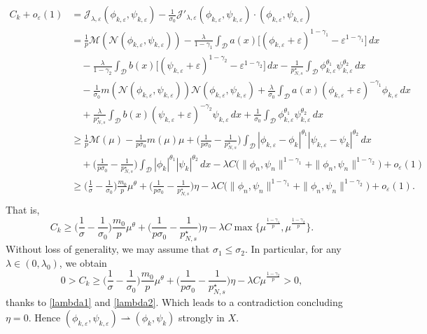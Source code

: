 \documentclass[reqno]{amsart}
\begin{document}
\begin{align*}
C_k+o_\varepsilon(1)&=\mathcal{J}_{\lambda,\varepsilon}(\phi_{k,\varepsilon},\psi_{k,\varepsilon})-\frac{1}{\sigma_0}\mathcal{J}'_{\lambda,\varepsilon}(\phi_{k,\varepsilon},\psi_{k,\varepsilon})\cdot (\phi_{k,\varepsilon},\psi_{k,\varepsilon})\\
&=\frac{1}{p}\mathscr{M}(\mathcal{N}(\phi_{k,\varepsilon},\psi_{k,\varepsilon}))-\frac{\lambda}{1-\gamma_1}\int_\mathcal{D} a(x)\Big[(\phi_{k,\varepsilon}+\varepsilon)^{1-\gamma_1}-\varepsilon^{1-\gamma_1}\Big]\,dx\\
&\quad-\frac{\lambda}{1-\gamma_2}\int_\mathcal{D} b(x)\Big[(\psi_{k,\varepsilon}+\varepsilon)^{1-\gamma_2}-\varepsilon^{1-\gamma_2}\Big]\,dx-\frac{1}{p^\star_{N,s}}\int_\mathcal{D}  \phi_{k,\varepsilon}^{\theta_1}\psi_{k,\varepsilon}^{\theta_2}\,dx\\
&\quad-\frac{1}{\sigma_0}m(\mathcal{N}(\phi_{k,\varepsilon},\psi_{k,\varepsilon}))\mathcal{N}(\phi_{k,\varepsilon},\psi_{k,\varepsilon})+\frac{\lambda}{\sigma_0}\int_\mathcal{D} a(x) (\phi_{k,\varepsilon}+\varepsilon)^{-\gamma_1}\phi_{k,\varepsilon}\,dx \\
&\quad+\frac{\lambda}{p^\star_{N,s}}\int_\mathcal{D}b(x)(\psi_{k,\varepsilon}+\varepsilon)^{-\gamma_2}\psi_{k,\varepsilon}\,dx+\frac{1}{\sigma_0}\int_\mathcal{D}\phi_{k,\varepsilon}^{\theta_1}\psi_{k,\varepsilon}^{\theta_2}\,dx\\
&\geq\frac{1}{p}\mathscr{M}(\mu)-\frac{1}{p\sigma_0}m(\mu)\mu+\Big(\frac{1}{p\sigma_0}-\frac{1}{p^\star_{N,s}}\Big)\int_\mathcal{D} |\phi_{k,\varepsilon}-\phi_k|^{\theta_1}|\psi_{k,\varepsilon}-\psi_k|^{\theta_2}\,dx\\
&\quad+\Big(\frac{1}{p\sigma_0}-\frac{1}{p^\star_{N,s}}\Big)\int_\mathcal{D} |\phi_k|^{\theta_1}|\psi_k|^{\theta_2}\,dx-\lambda C\Big(\| \phi_n,\psi_n\|^{1-\gamma_1}+ \| \phi_n,\psi_n\|^{1-\gamma_2}\Big)+o_\varepsilon(1)\\
&\geq\Big(\frac{1}{\sigma}-\frac{1}{\sigma_0}\Big)\frac{m_0}{p}\mu^\theta+\Big(\frac{1}{p\sigma_0}-\frac{1}{p^\star_{N,s}}\Big)\eta-\lambda C\Big(\| \phi_n,\psi_n\|^{1-\gamma_1}+ \| \phi_n,\psi_n\|^{1-\gamma_2}\Big)+o_\varepsilon(1).\\
\end{align*}
That is,
$$
C_k\geq  \Big(\frac{1}{\sigma}-\frac{1}{\sigma_0}\Big)
\frac{m_0}{p}\mu^\theta+\Big(\frac{1}{p\sigma_0}-\frac{1}{p^\star_{N,s}}\Big)
\eta-\lambda C \max\lbrace \mu^\frac{1-\gamma_1}{p},\mu^\frac{1-\gamma_2}{p} \rbrace.
$$
Without loss of generality, we may assume that $\sigma_1\leq\sigma_2$. 
In particular, for any $\lambda\in (0,\lambda_0)$, we obtain
$$
0>C_k\geq \Big(\frac{1}{\sigma}-\frac{1}{\sigma_0}\Big)\frac{m_0}{p}\mu^\theta
+\Big(\frac{1}{p\sigma_0}-\frac{1}{p^\star_{N,s}}\Big)\eta
-\lambda C \mu^\frac{1-\gamma_2}{p}>0, 
$$
thanks to \eqref{lambda1} and \eqref{lambda2}. Which leads to a contradiction concluding 
$\eta=0$. Hence $(\phi_{k,\varepsilon},\psi_{k,\varepsilon})
\rightharpoonup (\phi_k,\psi_k)$ strongly in $X$.
\smallskip
\end{document}
